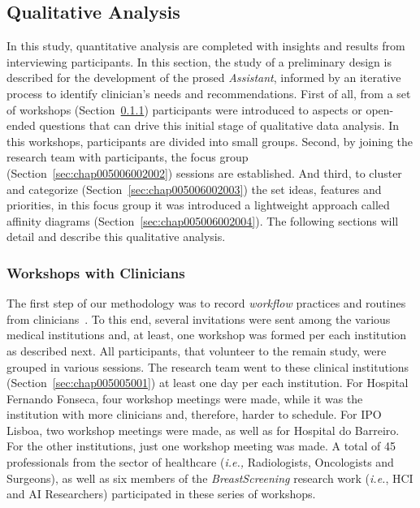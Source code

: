 \subsection{Qualitative Analysis}
\label{sec:chap005006002}

In this study, quantitative analysis are completed with insights and results from interviewing participants.
In this section, the study of a preliminary design is described for the development of the prosed {\it Assistant}, informed by an iterative process to identify clinician's needs and recommendations.
First of all, from a set of workshops (Section~\ref{sec:chap005006002001}) participants were introduced to aspects or open-ended questions that can drive this initial stage of qualitative data analysis.
In this workshops, participants are divided into small groups.
Second, by joining the research team with participants, the focus group (Section~\ref{sec:chap005006002002}) sessions are established.
And third, to cluster and categorize (Section~\ref{sec:chap005006002003}) the set ideas, features and priorities, in this focus group it was introduced a lightweight approach called affinity diagrams (Section~\ref{sec:chap005006002004}).
The following sections will detail and describe this qualitative analysis.

\subsubsection{Workshops with Clinicians}
\label{sec:chap005006002001}

The first step of our methodology was to record {\it workflow} practices and routines from clinicians~\cite{Hoiseth:2013:DHG:2485760.2485770, Hoiseth:2013:RGD:2468356.2468436}.
To this end, several invitations were sent among the various medical institutions and, at least, one workshop was formed per each institution as described next.
All participants, that volunteer to the remain study, were grouped in various sessions.
The research team went to these clinical institutions (Section~\ref{sec:chap005005001}) at least one day per each institution.
For Hospital Fernando Fonseca, four workshop meetings were made, while it was the institution with more clinicians and, therefore, harder to schedule.
For IPO Lisboa, two workshop meetings were made, as well as for Hospital do Barreiro.
For the other institutions, just one workshop meeting was made.
A total of 45 professionals from the sector of healthcare ({\it i.e.,} Radiologists, Oncologists and Surgeons), as well as six members of the {\it BreastScreening} research work ({\it i.e.}, \ac{HCI} and \ac{AI} Researchers) participated in these series of workshops.

